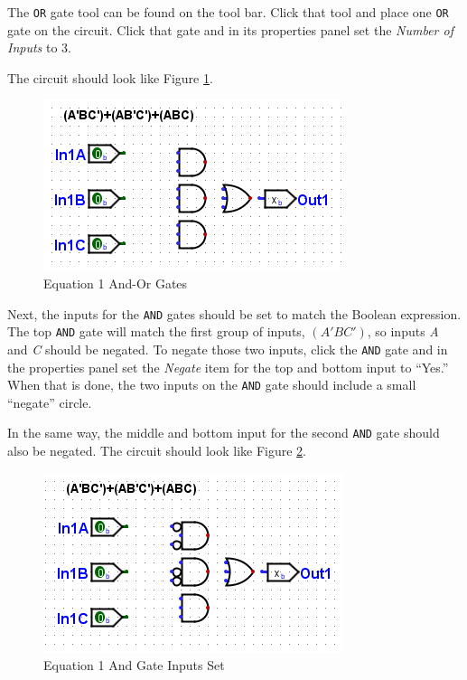 The \texttt{OR} gate tool can be found on the tool bar. Click that tool and place one \texttt{OR} gate on the circuit. Click that gate and in its properties panel set the \textit{Number of Inputs} to 3.

The circuit should look like Figure \ref{fig:bool-02}.

\begin{figure}[H]
	\centering
	\includegraphics[width=\maxwidth{.95\linewidth}]{gfx/bool-02}
	\caption{Equation 1 And-Or Gates}
	\label{fig:bool-02}
\end{figure}

Next, the inputs for the \texttt{AND} gates should be set to match the Boolean expression. The top \texttt{AND} gate will match the first group of inputs, $ (A'BC') $, so inputs \textit{A} and \textit{C} should be negated. To negate those two inputs, click the \texttt{AND} gate and in the properties panel set the \textit{Negate} item for the top and bottom input to ``Yes.'' When that is done, the two inputs on the \texttt{AND} gate should include a small ``negate'' circle.

In the same way, the middle and bottom input for the second \texttt{AND} gate should also be negated. The circuit should look like Figure \ref{fig:bool-03}.

\begin{figure}[H]
	\centering
	\includegraphics[width=\maxwidth{.95\linewidth}]{gfx/bool-03}
	\caption{Equation 1 And Gate Inputs Set}
	\label{fig:bool-03}
\end{figure}

